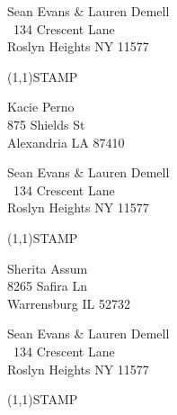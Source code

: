\documentclass[12pt]{article}
\begin{document}
\begin{minipage}{.5\linewidth} \noindent
Sean Evans \& Lauren Demell\\\ 
134 Crescent Lane\\ 
Roslyn Heights NY 11577
\end{minipage}
\begin{minipage}{.5\linewidth \hspace{-.2in} \vspace{-.3in}}
\begin{flushright}
\framebox(1,1){STAMP}
\end{flushright}
\end{minipage}

\begin{center} \begin{Huge} \vspace*{\fill}
Kacie Perno\\
875 Shields St\\
Alexandria LA 87410\\
\vspace{\fill} \end{Huge} \end{center}

\clearpage

\begin{minipage}{.5\linewidth} \noindent
Sean Evans \& Lauren Demell\\\ 
134 Crescent Lane\\ 
Roslyn Heights NY 11577
\end{minipage}
\begin{minipage}{.5\linewidth \hspace{-.2in} \vspace{-.3in}}
\begin{flushright}
\framebox(1,1){STAMP}
\end{flushright}
\end{minipage}

\begin{center} \begin{Huge} \vspace*{\fill}
Sherita Assum\\
8265 Safira Ln\\
Warrensburg IL 52732\\
\vspace{\fill} \end{Huge} \end{center}

\clearpage

\begin{minipage}{.5\linewidth} \noindent
Sean Evans \& Lauren Demell\\\ 
134 Crescent Lane\\ 
Roslyn Heights NY 11577
\end{minipage}
\begin{minipage}{.5\linewidth \hspace{-.2in} \vspace{-.3in}}
\begin{flushright}
\framebox(1,1){STAMP}
\end{flushright}
\end{minipage}
\end{document}

